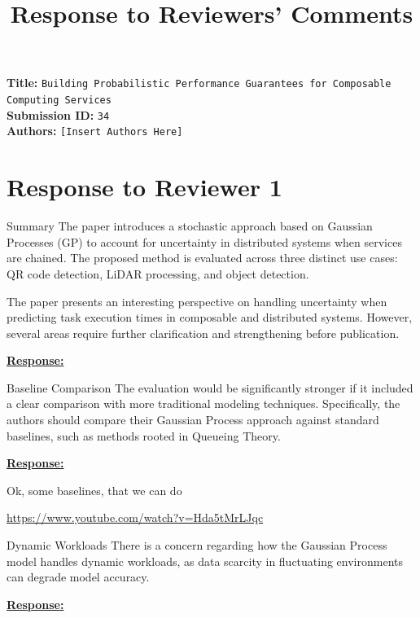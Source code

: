 \documentclass{article}
\title{Response to Reviewers' Comments}
\date{\vspace{-5ex}}
\author{\vspace{-5ex}}
\newcommand{\Response}[1][]{%
    \noindent\underline{\textbf{Response:}}\par\vspace{0.2cm}%
    #1\par\vspace{0.6cm}%
}
\begin{document}
 
\maketitle

\noindent \textbf{Title: }\texttt{Building Probabilistic Performance Guarantees for Composable Computing Services} \\
\noindent \textbf{Submission ID: } \texttt{34}\\
\noindent \textbf{Authors: } \texttt{[Insert Authors Here]}\\


\section{Response to Reviewer 1} 

\begin{cmt*}{Summary}{}
The paper introduces a stochastic approach based on Gaussian Processes (GP) to account for uncertainty in distributed systems when services are chained. The proposed method is evaluated across three distinct use cases: QR code detection, LiDAR processing, and object detection.  

The paper presents an interesting perspective on handling uncertainty when predicting task execution times in composable and distributed systems. However, several areas require further clarification and strengthening before publication.
\end{cmt*}
\Response

\begin{cmt}{Baseline Comparison}{}
The evaluation would be significantly stronger if it included a clear comparison with more traditional modeling techniques. Specifically, the authors should compare their Gaussian Process approach against standard baselines, such as methods rooted in Queueing Theory.
\end{cmt}

\Response Ok, some baselines, that we can do

\url{https://www.youtube.com/watch?v=Hda5tMrLJqc}

\begin{cmt}{Dynamic Workloads}{}
There is a concern regarding how the Gaussian Process model handles dynamic workloads, as data scarcity in fluctuating environments can degrade model accuracy.
\end{cmt}
\Response
\end{document}
